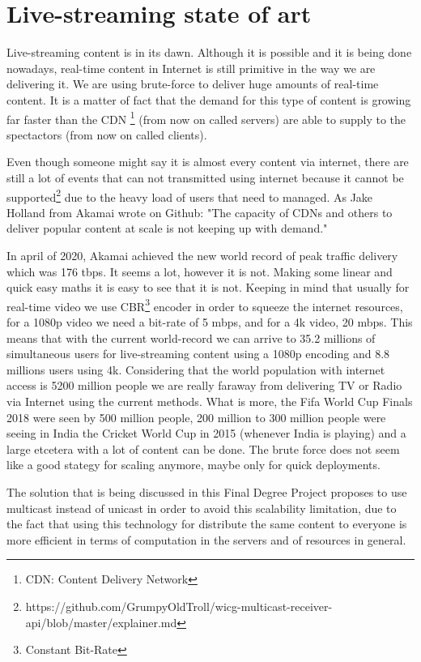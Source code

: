 \section{Live-streaming state of art }

{
    Live-streaming content is in its dawn. Although it is possible and it is being done nowadays, real-time content in Internet is still primitive
    in the way we are delivering it. We are using brute-force to deliver huge amounts of real-time content. It is a matter of fact that 
    the demand for this type of content is growing far faster than the CDN \footnote{CDN: Content Delivery Network} (from now on called servers)
    are able to supply to the spectactors (from now on called clients).
    
    Even though someone might say it is almost every content via internet, there are still a lot of events that can not transmitted using internet 
    because it cannot be supported\footnote{https://github.com/GrumpyOldTroll/wicg-multicast-receiver-api/blob/master/explainer.md} due to the heavy load
    of users that need to managed. As Jake Holland from Akamai wrote on Github: "The capacity of CDNs and others to deliver popular content at scale is 
    not keeping up with demand."

    In april of 2020, Akamai achieved the new world record of peak traffic delivery which was 176 tbps. It seems a lot, however it is not. Making some linear
    and quick easy maths it is easy to see that it is not. Keeping in mind that usually for real-time video we use CBR\footnote{Constant Bit-Rate} encoder in
    order to squeeze the internet resources, for a 1080p video we need a bit-rate of 5 mbps, and for a 4k video, 20 mbps. This means that with the current
    world-record we can arrive to 35.2 millions of simultaneous users for live-streaming content using a 1080p encoding and 8.8 millions users using 4k.
    Considering that the world population with internet access is 5200 million people we are really faraway from delivering TV or Radio via Internet using
    the current methods. What is more, the Fifa World Cup Finals 2018 were seen by 500 million people, 200 million to 300 million people were seeing in India the Cricket
    World Cup in 2015 (whenever India is playing) and a large etcetera with a lot of content can be done.  The brute force does not seem like a good stategy for scaling 
    anymore, maybe only for quick deployments.

    The solution that is being discussed in this Final Degree Project proposes to use multicast instead of unicast in order to avoid this scalability limitation, due to
    the fact that using this technology for distribute the same content to everyone is more efficient in terms of computation in the servers and of resources in general.
}

